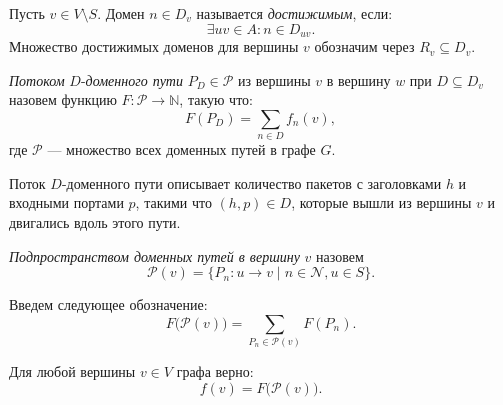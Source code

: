 \documentclass[../thesis.tex]{subfiles}
\begin{document}
\begin{definition}
Пусть $v \in V \setminus S$.
Домен $n \in D_v$ называется \textit{достижимым}, если:
\begin{equation}
    \exists uv \in A : n \in D_{uv}.
\end{equation}
Множество достижимых доменов для вершины $v$ обозначим через $R_v \subseteq D_v$.
\end{definition}

\begin{definition}
\textit{Потоком} $D$-\textit{доменного пути} $P_D\in \mathscr{P}$ из вершины $v$ в вершину $w$ при $D\subseteq D_v$ назовем функцию $F:\mathscr{P}\rightarrow \mathbb{N}$, такую что:
\begin{equation} \label{eq:F(P_D)}
    F(P_D) = \sum_{n\in D} {f_n(v)},
\end{equation}
где $\mathscr{P}$ --- множество всех доменных путей в графе $G$.
\end{definition}

Поток $D$-доменного пути описывает количество пакетов с заголовками $h$ и входными портами $p$, такими что $(h,p)\in D$, которые вышли из вершины $v$ и двигались вдоль этого пути.

\begin{definition}
\textit{Подпространством доменных путей в вершину} $v$ назовем
\begin{equation}
    \mathcal{P}(v) = \{ P_n:u\rightarrow v \;|\; n \in\mathcal{N}, u\in S \}.
\end{equation}
\end{definition}

Введем следующее обозначение:
\begin{equation}
    F\big( \mathcal{P}(v) \big) = \sum_{P_n\in\mathcal{P}(v)}{F(P_n)}.
\end{equation}

\begin{theorem} \label{th:f_P_v}
Для любой вершины $v\in V$ графа верно:
\begin{equation}
    f(v) = F\big(\mathcal{P}(v)\big).
\end{equation}
\end{theorem}
\end{document}
